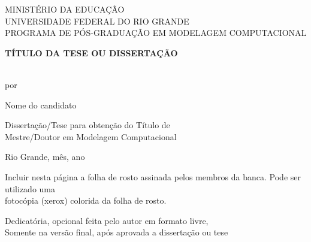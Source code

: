 \documentclass[a4paper,12pt,oneside]{article}
\numberwithin{equation}{section}
\begin{document}
\onehalfspacing
\pagestyle{myheadings}

\thispagestyle{empty}
\begin{center}

MINISTÉRIO DA EDUCAÇÃO\\
UNIVERSIDADE FEDERAL DO RIO GRANDE\\
PROGRAMA DE PÓS-GRADUAÇÃO EM MODELAGEM COMPUTACIONAL\\
\vspace*{2.5cm}

\vspace{3cm}
\begin{large}
\textbf{\uppercase{
	Título da tese ou dissertação
}}
\end{large}
\vspace*{2cm}\\por\vspace*{2cm}

Nome do candidato

\vspace*{2.5cm}
Dissertação/Tese para obtenção do Título de\\
Mestre/Doutor em Modelagem Computacional

\vspace{6cm}Rio Grande, mês, ano

\end{center}



\newpage
\thispagestyle{empty}


Incluir nesta página a folha de rosto assinada pelos membros da banca. Pode ser utilizado uma\\
fotocópia (xerox) colorida da folha de rosto.


\newpage
\thispagestyle{empty}
\begin{flushright}\vspace*{5cm}

Dedicatória, opcional feita pelo autor em formato livre,\\
Somente na versão final, após aprovada a dissertação ou tese\\

\end{flushright}
\end{document}
